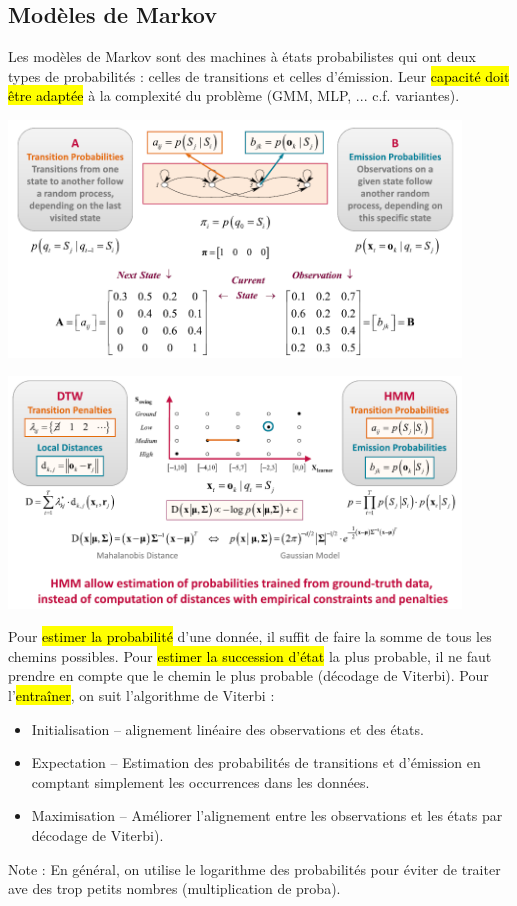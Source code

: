 \documentclass[letterpaper, 12pt]{article}
\newcommand{\alinea}{
\hspace*{0.5cm}}
\begin{document}
		\subsection{Modèles de Markov}
			\alinea Les modèles de Markov sont des machines à états probabilistes qui ont deux types de probabilités : 
				celles de transitions et celles d'émission. Leur \hl{capacité doit être adaptée} à la complexité du problème
				(GMM, MLP, ... c.f. variantes).
				\begin{center}
					\includegraphics[width=0.9\textwidth]{Images/hmm}
				\end{center}
			\begin{center}
				\includegraphics[width=0.9\textwidth]{Images/hmm2}
			\end{center}
			\alinea Pour \hl{estimer la probabilité} d'une donnée, il suffit de faire la somme de tous les chemins possibles. 
				Pour \hl{estimer la succession d'état} la plus probable, il ne faut prendre en compte que le chemin le plus
				probable (décodage de Viterbi). Pour l'\hl{entraîner}, on suit l'algorithme de Viterbi : 
				\begin{itemize}
					\setlength\itemsep{0cm}
					\item Initialisation -- alignement linéaire des observations et des états.
					\item Expectation -- Estimation des probabilités de transitions et d'émission en comptant simplement
						les occurrences dans les données.
					\item Maximisation -- Améliorer l'alignement entre les observations et les états par décodage de Viterbi).
				\end{itemize}
				Note : En général, on utilise le logarithme des probabilités pour éviter de traiter ave des trop petits nombres 
				(multiplication de proba).	
\end{document}
